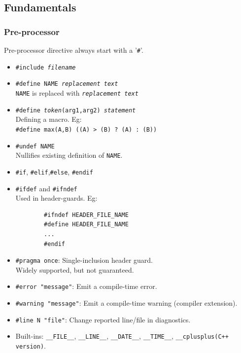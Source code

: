 \subsection{Fundamentals}


\subsubsection{Pre-processor}

\begin{minipage}{\linewidth}
Pre-processor directive always start with a '\texttt{\#}'.

\begin{itemize}
    \item \texttt{\#include \textit{filename}}\\

    \item \texttt{\#define NAME \textit{replacement text}} \\
    \texttt{NAME} is replaced with \texttt{\textit{replacement text}} \\

    \item \texttt{\#define \textit{token}(arg1,arg2) \textit{statement}} \\
    Defining a macro. Eg: \\
    \texttt{\#define max(A,B) ((A) > (B) ? (A) : (B))}

    \item \texttt{\#undef NAME} \\
    Nullifies existing definition of \texttt{NAME}. 

    \item \texttt{\#if}, \texttt{\#elif},\texttt{\#else}, \texttt{\#endif}\\

    \item \texttt{\#ifdef}  and \texttt{\#ifndef}\\
    Used in header-guards. Eg: \\
    \begin{verbatim}
        #ifndef HEADER_FILE_NAME
        #define HEADER_FILE_NAME
        ...
        #endif
    \end{verbatim}

    \item \texttt{\#pragma once}: Single-inclusion header guard.\\
            Widely supported, but not guaranteed.
    \item \texttt{\#error "message"}: Emit a compile-time error.
    \item \texttt{\#warning "message"}: Emit a compile-time warning (compiler extension).
    \item \texttt{\#line N "file"}: Change reported line/file in diagnostics.
    \item Built-ins: \verb|__FILE__|, \verb|__LINE__|, \verb|__DATE__|, \verb|__TIME__|, \verb|__cplusplus(C++ version)|.

\end{itemize}
\end{minipage}